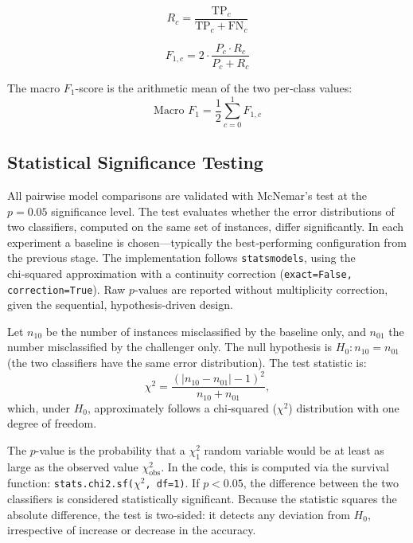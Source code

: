 \documentclass[a4paper,twoside,12pt]{book}
\newcommand{\code}[1]{\texttt{#1}}
\newcommand{\instanceClass}{c}
\newcommand{\mcnemarp}{p}
\newcommand{\mcnemarchi}{\chi^2}
\newcommand{\missclassified}[1]{n_{#1}}
\newcommand{\nullhypo}{H_0}
\begin{document}
\begin{equation}
	R_{\instanceClass} = \frac{\text{TP}_{\instanceClass}}{\text{TP}_{\instanceClass} + \text{FN}_{\instanceClass}}
\end{equation}

\begin{equation}
	F_{1,\instanceClass} = 2 \cdot \frac{P_{\instanceClass} \cdot R_{\instanceClass}}{P_{\instanceClass} + R_{\instanceClass}}
\end{equation}

The macro $F_1$-score is the arithmetic mean of the two per‑class values:
\begin{equation}
	\text{Macro } F_1 = \frac{1}{2} \sum_{\instanceClass=0}^{1} F_{1,\instanceClass}
\end{equation}

\subsection{Statistical Significance Testing}

All pairwise model comparisons are validated with McNemar’s test at the $\mcnemarp = 0.05$ significance level.
The test evaluates whether the error distributions of two classifiers, computed on the same set of instances, differ significantly.
In each experiment a baseline is chosen---typically the best‑performing configuration from the previous stage.
The implementation follows \texttt{statsmodels}, using the chi‑squared approximation with a continuity correction (\code{exact=False, correction=True}).
Raw $\mcnemarp$-values are reported without multiplicity correction, given the sequential, hypothesis‑driven design.

Let $\missclassified{10}$ be the number of instances misclassified by the baseline only, and $\missclassified{01}$ the number misclassified by the challenger only.
The null hypothesis is $\nullhypo: \missclassified{10} = \missclassified{01}$ (the two classifiers have the same error distribution).
The test statistic is:
\begin{equation}
	\mcnemarchi = \frac{(|\missclassified{10} - \missclassified{01}| - 1)^2}{\missclassified{10} + \missclassified{01}},
\end{equation}
which, under $\nullhypo$, approximately follows a chi‑squared ($\mcnemarchi$) distribution with one degree of freedom.

The $\mcnemarp$-value is the probability that a $\mcnemarchi_1$ random variable would be at least as large as the observed value $\mcnemarchi_{\text{obs}}$.
In the code, this is computed via the survival function: \code{stats.chi2.sf(}$\mcnemarchi$\code{, df=1)}.
If $\mcnemarp < 0.05$, the difference between the two classifiers is considered statistically significant.
Because the statistic squares the absolute difference, the test is two‑sided: it detects any deviation from $\nullhypo$, irrespective of increase or decrease in the accuracy.
\end{document}
